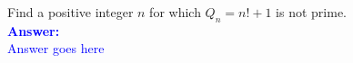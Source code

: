 \item{}
Find a positive integer $n$ for which $Q_n=n!+1$ is not prime.
\\[12pt]
\ifanswers
\textcolor{blue}{
\textbf{Answer:}\\[6pt]
Answer goes here
}
\newpage
\fi
